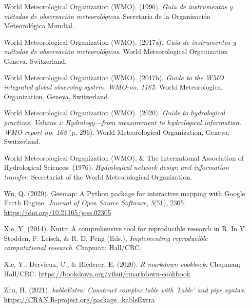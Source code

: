 \documentclass[spanish]{article}
\newlength{\cslhangindent}
\newlength{\cslentryspacingunit} %
\newenvironment{CSLReferences}[2] %
 {%
  \setlength{\parindent}{0pt}
  \ifodd #1
  \let\oldpar\par
  \def\par{\hangindent=\cslhangindent\oldpar}
  \fi
  \setlength{\parskip}{#2\cslentryspacingunit}
 }%
 {}
\begin{document}
\begin{CSLReferences}{1}{0}
\leavevmode{}%
World Meteorological Organization (WMO). (1996). \emph{Guía de
instrumentos y métodos de observación meteorológicos}. Secretaría de la
Organización Meteorológica Mundial.

\leavevmode{}%
World Meteorological Organization (WMO). (2017a). \emph{Guía de
instrumentos y métodos de observación meteorológicos}. World
Meteorological Organization Geneva, Switzerland.

\leavevmode{}%
World Meteorological Organization (WMO). (2017b). \emph{Guide to the WMO
integrated global observing system. WMO-no. 1165}. World Meteorological
Organization, Geneva, Switzerland.

\leavevmode{}%
World Meteorological Organization (WMO). (2020). \emph{Guide to
hydrological practices. Volume i: Hydrology---from measurement to
hydrological information. WMO report no. 168} (p. 296). World
Meteorological Organization, Geneva, Switzerland.

\leavevmode{}%
World Meteorological Organization (WMO), \& The International
Association of Hydrological Sciences. (1976). \emph{Hydrological network
design and information transfer}. {Secretariat of the World
Meteorological Organization}.

\leavevmode{}%
Wu, Q. (2020). Geemap: {A} {Python} package for interactive mapping with
{Google} {Earth} {Engine}. \emph{Journal of Open Source Software},
\emph{5}(51), 2305. \url{https://doi.org/10.21105/joss.02305}

\leavevmode{}%
Xie, Y. (2014). Knitr: A comprehensive tool for reproducible research in
{R}. In V. Stodden, F. Leisch, \& R. D. Peng (Eds.), \emph{Implementing
reproducible computational research}. Chapman; Hall/CRC.

\leavevmode{}%
Xie, Y., Dervieux, C., \& Riederer, E. (2020). \emph{R markdown
cookbook}. Chapman; Hall/CRC.
\url{https://bookdown.org/yihui/rmarkdown-cookbook}

\leavevmode{}%
Zhu, H. (2021). \emph{kableExtra: Construct complex table with 'kable'
and pipe syntax}. \url{https://CRAN.R-project.org/package=kableExtra}

\end{CSLReferences}



\end{document}
